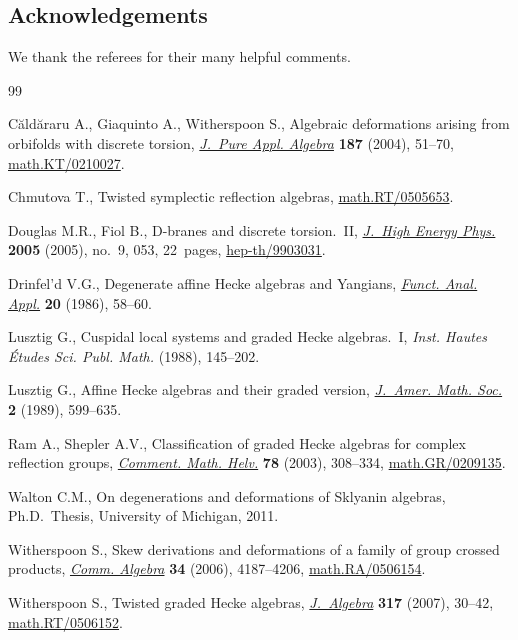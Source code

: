 \documentclass[pdftex]{sigma}
\numberwithin{equation}{section}
\begin{document}
\subsection*{Acknowledgements}

We thank the referees for their many helpful comments.

\begin{thebibliography}{99}
\footnotesize \itemsep=0pt

C{\u{a}}ld{\u{a}}raru A., Giaquinto A., Witherspoon S., Algebraic deformations
  arising from orbifolds with discrete torsion, \href{http://dx.doi.org/10.1016/j.jpaa.2003.10.004}{\textit{J.~Pure Appl. Algebra}}
  \textbf{187} (2004), 51--70, \href{http://arxiv.org/abs/math.KT/0210027}{math.KT/0210027}.

Chmutova T., Twisted symplectic ref\/lection algebras, \href{http://arxiv.org/abs/math.RT/0505653}{math.RT/0505653}.

Douglas M.R., Fiol B., D-branes and discrete torsion.~{II}, \href{http://dx.doi.org/10.1088/1126-6708/2005/09/053}{\textit{J.~High
  Energy Phys.}} \textbf{2005} (2005), no.~9, 053, 22~pages,
  \href{http://arxiv.org/abs/hep-th/9903031}{hep-th/9903031}.

Drinfel'd V.G., Degenerate af\/f\/ine {H}ecke algebras and {Y}angians,
  \href{http://dx.doi.org/10.1007/BF01077318}{\textit{Funct. Anal. Appl.}} \textbf{20} (1986), 58--60.

Lusztig G., Cuspidal local systems and graded {H}ecke algebras.~{I},
  \textit{Inst. Hautes \'Etudes Sci. Publ. Math.}  (1988), 145--202.

Lusztig G., Af\/f\/ine {H}ecke algebras and their graded version, \href{http://dx.doi.org/10.2307/1990945}{\textit{J.~Amer.
  Math. Soc.}} \textbf{2} (1989), 599--635.

Ram A., Shepler A.V., Classif\/ication of graded {H}ecke algebras for complex
  ref\/lection groups, \href{http://dx.doi.org/10.1007/s000140300013}{\textit{Comment. Math. Helv.}} \textbf{78} (2003),
  308--334, \href{http://arxiv.org/abs/math.GR/0209135}{math.GR/0209135}.

Walton C.M., On degenerations and deformations of {S}klyanin algebras, Ph.D.\
Thesis, University of Michigan, 2011.

Witherspoon S., Skew derivations and deformations of a family of group crossed
  products, \href{http://dx.doi.org/10.1080/00927870600876367}{\textit{Comm. Algebra}} \textbf{34} (2006), 4187--4206,
  \href{http://arxiv.org/abs/math.RA/0506154}{math.RA/0506154}.

Witherspoon S., Twisted graded {H}ecke algebras, \href{http://dx.doi.org/10.1016/j.jalgebra.2007.05.025}{\textit{J.~Algebra}}
  \textbf{317} (2007), 30--42, \href{http://arxiv.org/abs/math.RT/0506152}{math.RT/0506152}.

\end{thebibliography}\LastPageEnding
\end{document}
